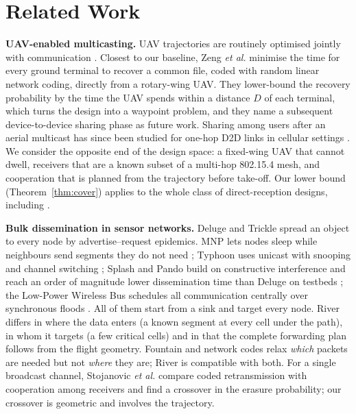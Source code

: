 \section{Related Work}\label{sec:related}
\textbf{UAV-enabled multicasting.} UAV trajectories are routinely optimised jointly with communication
\cite{zeng2016mag,mozaffari2019,wu2018,zeng2017energy}. Closest to our baseline, Zeng \emph{et al.}
\cite{zeng2018multicast} minimise the time for every ground terminal to recover a common file, coded with random linear
network coding, directly from a rotary-wing UAV. They lower-bound the recovery probability by the time the UAV spends
within a distance $D$ of each terminal, which turns the design into a waypoint problem, and they name a subsequent
device-to-device sharing phase as future work. Sharing among users after an aerial multicast has since been studied for
one-hop D2D links in cellular settings \cite{wang2020d2d,miao2020}. We consider the opposite end of the design space: a
fixed-wing UAV that cannot dwell, receivers that are a known subset of a multi-hop 802.15.4 mesh, and cooperation that is
planned from the trajectory before take-off. Our lower bound (Theorem~\ref{thm:cover}) applies to the whole class of
direct-reception designs, including \cite{zeng2018multicast}.

\textbf{Bulk dissemination in sensor networks.} Deluge \cite{hui2004} and Trickle \cite{levis2004} spread an object to
every node by advertise--request epidemics. MNP lets nodes sleep while neighbours send segments they do not need
\cite{kulkarni2005}; Typhoon uses unicast with snooping and channel switching \cite{liang2008}; Splash and Pando build on
constructive interference and reach an order of magnitude lower dissemination time than Deluge on testbeds
\cite{doddavenkatappa2013,du2017}; the Low-Power Wireless Bus schedules all communication centrally over synchronous
floods \cite{ferrari2012}. All of them start from a sink and target every node. River differs in where the data enters
(a known segment at every cell under the path), in whom it targets (a few critical cells) and in that the complete
forwarding plan follows from the flight geometry. Fountain and network codes \cite{luby2002,shokrollahi2006,ho2006}
relax \emph{which} packets are needed but not \emph{where} they are; River is compatible with both. For a single
broadcast channel, Stojanovic \emph{et al.} \cite{stojanovic2009} compare coded retransmission with cooperation among
receivers and find a crossover in the erasure probability; our crossover is geometric and involves the trajectory.

